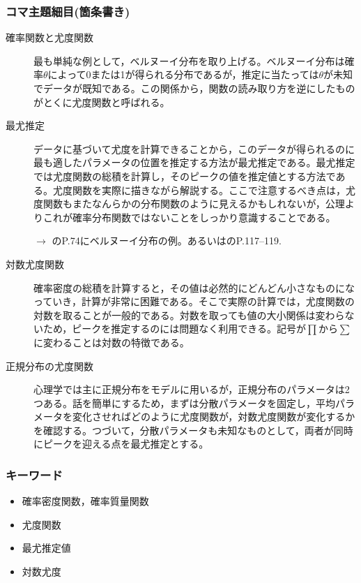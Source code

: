 \subsubsection{コマ主題細目(箇条書き)}
\begin{description}
	\item[確率関数と尤度関数]最も単純な例として，ベルヌーイ分布を取り上げる。ベルヌーイ分布は確率$\theta$によって0または1が得られる分布であるが，推定に当たっては$\theta$が未知でデータが既知である。この関係から，関数の読み取り方を逆にしたものがとくに尤度関数と呼ばれる。

	\item[最尤推定]データに基づいて尤度を計算できることから，このデータが得られるのに最も適したパラメータの位置を推定する方法が最尤推定である。最尤推定では尤度関数の総積を計算し，そのピークの値を推定値とする方法である。尤度関数を実際に描きながら解説する。ここで注意するべき点は，尤度関数もまたなんらかの分布関数のように見えるかもしれないが，公理よりこれが確率分布関数ではないことをしっかり意識することである。
	      \begin{flushright}
		      $\to$ \citet{Nojima201903}のP.74にベルヌーイ分布の例。あるいは\citet{kosugi2018}のP.117--119.
	      \end{flushright}


	\item[対数尤度関数]確率密度の総積を計算すると，その値は必然的にどんどん小さなものになっていき，計算が非常に困難である。そこで実際の計算では，尤度関数の対数を取ることが一般的である。対数を取っても値の大小関係は変わらないため，ピークを推定するのには問題なく利用できる。記号が$\prod$から$\sum$に変わることは対数の特徴である。

	\item[正規分布の尤度関数]心理学では主に正規分布をモデルに用いるが，正規分布のパラメータは2つある。話を簡単にするため，まずは分散パラメータを固定し，平均パラメータを変化させればどのように尤度関数が，対数尤度関数が変化するかを確認する。つづいて，分散パラメータも未知なものとして，両者が同時にピークを迎える点を最尤推定とする。

\end{description}
\subsubsection{キーワード}
\begin{itemize}
	\item 確率密度関数，確率質量関数
	\item 尤度関数
	\item 最尤推定値
	\item 対数尤度
\end{itemize}
